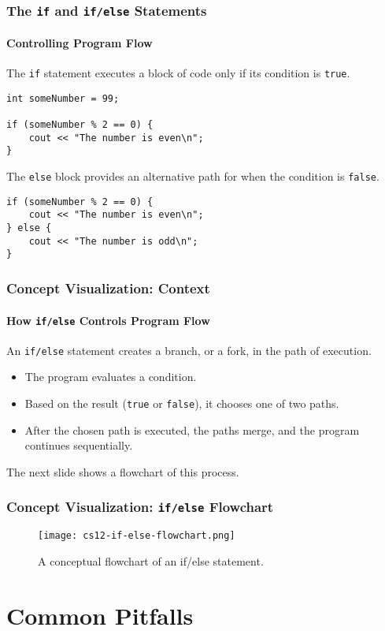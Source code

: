 \documentclass{beamer}
\begin{document}
\begin{frame}[fragile]
\frametitle{The \texttt{if} and \texttt{if/else} Statements}
\framesubtitle{Controlling Program Flow}

The \texttt{if} statement executes a block of code only if its condition is \texttt{true}.

\begin{verbatim}
int someNumber = 99;

if (someNumber % 2 == 0) {
    cout << "The number is even\n";
}
\end{verbatim}

\pause
The \texttt{else} block provides an alternative path for when the condition is \texttt{false}.

\begin{verbatim}
if (someNumber % 2 == 0) {
    cout << "The number is even\n";
} else {
    cout << "The number is odd\n";
}
\end{verbatim}
\end{frame}

\begin{frame}
\frametitle{Concept Visualization: Context}
\framesubtitle{How \texttt{if/else} Controls Program Flow}
An \texttt{if/else} statement creates a branch, or a fork, in the path of execution.

\begin{itemize}
    \item The program evaluates a \alert{condition}.
    \item Based on the result (\texttt{true} or \texttt{false}), it chooses one of two paths.
    \item After the chosen path is executed, the paths merge, and the program continues sequentially.
\end{itemize}

The next slide shows a flowchart of this process.
\end{frame}

\begin{frame}
\frametitle{Concept Visualization: \texttt{if/else} Flowchart}
\begin{figure}
    \texttt{[image: cs12-if-else-flowchart.png]}
    \caption{A conceptual flowchart of an if/else statement.}
\end{figure}
\end{frame}

\section{Common Pitfalls}
\end{document}
